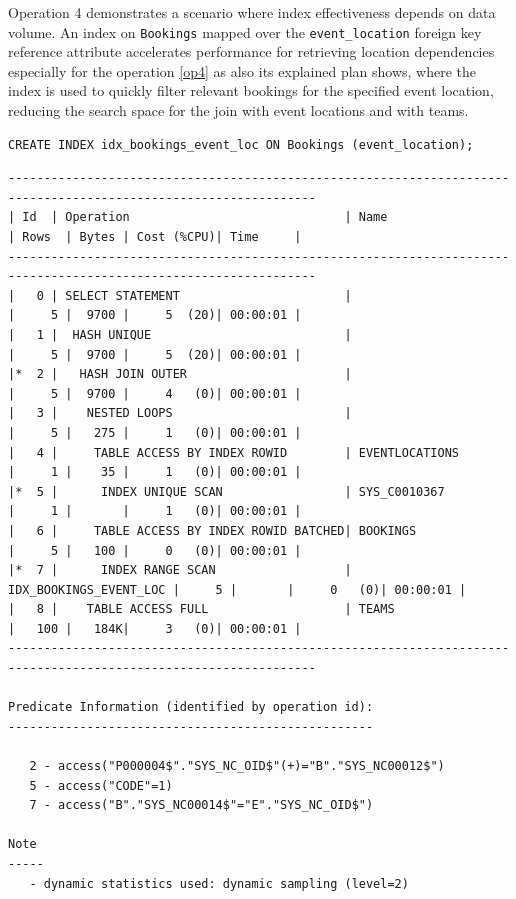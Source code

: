 Operation 4 demonstrates a scenario where index effectiveness depends on data volume. An index on \texttt{Bookings} mapped over the \texttt{event\_location} foreign key reference attribute accelerates performance for retrieving location dependencies especially for the operation \ref{op4} as also its explained plan shows, where the index is used to quickly filter relevant bookings for the specified event location, reducing the search space for the join with event locations and with teams.

\begin{verbatim}
CREATE INDEX idx_bookings_event_loc ON Bookings (event_location);
\end{verbatim}

{\scriptsize
\begin{verbatim}
-----------------------------------------------------------------------------------------------------------------
| Id  | Operation                              | Name                   | Rows  | Bytes | Cost (%CPU)| Time     |
-----------------------------------------------------------------------------------------------------------------
|   0 | SELECT STATEMENT                       |                        |     5 |  9700 |     5  (20)| 00:00:01 |
|   1 |  HASH UNIQUE                           |                        |     5 |  9700 |     5  (20)| 00:00:01 |
|*  2 |   HASH JOIN OUTER                      |                        |     5 |  9700 |     4   (0)| 00:00:01 |
|   3 |    NESTED LOOPS                        |                        |     5 |   275 |     1   (0)| 00:00:01 |
|   4 |     TABLE ACCESS BY INDEX ROWID        | EVENTLOCATIONS         |     1 |    35 |     1   (0)| 00:00:01 |
|*  5 |      INDEX UNIQUE SCAN                 | SYS_C0010367           |     1 |       |     1   (0)| 00:00:01 |
|   6 |     TABLE ACCESS BY INDEX ROWID BATCHED| BOOKINGS               |     5 |   100 |     0   (0)| 00:00:01 |
|*  7 |      INDEX RANGE SCAN                  | IDX_BOOKINGS_EVENT_LOC |     5 |       |     0   (0)| 00:00:01 |
|   8 |    TABLE ACCESS FULL                   | TEAMS                  |   100 |   184K|     3   (0)| 00:00:01 |
-----------------------------------------------------------------------------------------------------------------
 
Predicate Information (identified by operation id):
---------------------------------------------------
 
   2 - access("P000004$"."SYS_NC_OID$"(+)="B"."SYS_NC00012$")
   5 - access("CODE"=1)
   7 - access("B"."SYS_NC00014$"="E"."SYS_NC_OID$")
 
Note
-----
   - dynamic statistics used: dynamic sampling (level=2)
\end{verbatim}
}

